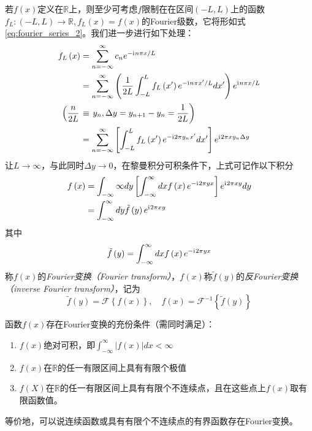 \documentclass[main.tex]{subfiles}
\begin{document}
若$f\left(x\right)$定义在$\mathbb{R}$上，则至少可考虑$f$限制在在区间$\left(-L,L\right)$上的函数$f_L:\left(-L,L\right)\rightarrow\mathbb{R},f_L\left(x\right)=f\left(x\right)$的Fourier级数，它将形如式\eqref{eq:fourier_series_2}。我们进一步进行如下处理：
\begin{align*}
    f_L\left(x\right)         & =\sum_{n=-\infty}^\infty c_ne^{-\mathrm{i}\mkern1mu n\pi x/L}                                                                                             \\
                              & =\sum_{n=-\infty}^\infty\left(\frac{1}{2L}\int_{-L}^L f_L\left(x^\prime\right)e^{-\mathrm{i}\mkern1mu n\pi x^\prime/L}dx^\prime\right)e^{\mathrm{i}\mkern1mu n\pi x/L} \\
    \left(\frac{n}{2L}\right. & \equiv \left.y_n,\Delta y=y_{n+1}-y_n=\frac{1}{2L}\right)                                                                                    \\
                              & =\sum_{n=-\infty}^\infty\left[\int_{-L}^Lf_L\left(x^\prime\right)e^{-\mathrm{i}\mkern1mu 2\pi y_nx^\prime}dx^\prime\right]e^{\mathrm{i}\mkern1mu 2\pi xy_n\Delta y}
\end{align*}
让$L\rightarrow\infty$，与此同时$\Delta y\rightarrow 0$，在黎曼积分可积条件下，上式可记作以下积分
\begin{align}\label{eq:fourier_transform_1}
    f\left(x\right) & =\int_{-\infty}{\infty}dy\left[\int_{-\infty}^\infty dxf\left(x\right)e^{-\mathrm{i}\mkern1mu 2\pi yx}\right]e^{\mathrm{i}\mkern1mu 2\pi xy}dy \\
                    & =\int_{-\infty}^\infty dy\tilde{f}\left(y\right)e^{\mathrm{i}\mkern1mu 2\pi xy}
\end{align}
其中
\[\tilde{f}\left(y\right)=\int_{-\infty}^\infty dxf\left(x\right)e^{-\mathrm{i}\mkern1mu 2\pi yx}\]
称$f\left(x\right)$的\emph{Fourier变换（Fourier transform）}，$f\left(x\right)$称$\tilde{f}\left(y\right)$的\emph{反Fourier变换（inverse Fourier transform）}，记为
\[\tilde{f}\left(y\right)=\mathcal{F}\left\{f\left(x\right)\right\},\quad f\left(x\right)=\mathcal{F}^{-1}\left\{\tilde{f}\left(y\right)\right\}\]

函数$f\left(x\right)$存在Fourier变换的充份条件（需同时满足）：
\begin{enumerate}
    \item $f\left(x\right)$绝对可积，即$\int_{-\infty}^{\infty}\left|f\left(x\right)\right|dx<\infty$
    \item $f\left(x\right)$在$\mathbb{R}$的任一有限区间上具有有限个极值
    \item $f\left(X\right)$在$\mathbb{R}$的任一有限区间上具有有限个不连续点，且在这些点上$f\left(x\right)$取有限函数值。
\end{enumerate}
等价地，可以说连续函数或具有有限个不连续点的有界函数存在Fourier变换。
\end{document}
